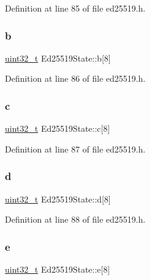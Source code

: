 Definition at line 85 of file ed25519.\+h.

\mbox{\label{structEd25519State_ab7959fd632debe6185b2c472467876d8}} 
\subsubsection{\texorpdfstring{b}{b}}
{\footnotesize\ttfamily \hyperlink{stdint_8h_a435d1572bf3f880d55459d9805097f62}{uint32\+\_\+t} Ed25519\+State\+::b\mbox{[}8\mbox{]}}



Definition at line 86 of file ed25519.\+h.

\mbox{\label{structEd25519State_a89709eaf7e108ce3561694b0f5a2d107}} 
\subsubsection{\texorpdfstring{c}{c}}
{\footnotesize\ttfamily \hyperlink{stdint_8h_a435d1572bf3f880d55459d9805097f62}{uint32\+\_\+t} Ed25519\+State\+::c\mbox{[}8\mbox{]}}



Definition at line 87 of file ed25519.\+h.

\mbox{\label{structEd25519State_a1a5b5dcf20f8a5ca52db680cf167e7be}} 
\subsubsection{\texorpdfstring{d}{d}}
{\footnotesize\ttfamily \hyperlink{stdint_8h_a435d1572bf3f880d55459d9805097f62}{uint32\+\_\+t} Ed25519\+State\+::d\mbox{[}8\mbox{]}}



Definition at line 88 of file ed25519.\+h.

\mbox{\label{structEd25519State_aea8e07abf5c03717fff2e06a3d403b05}} 
\subsubsection{\texorpdfstring{e}{e}}
{\footnotesize\ttfamily \hyperlink{stdint_8h_a435d1572bf3f880d55459d9805097f62}{uint32\+\_\+t} Ed25519\+State\+::e\mbox{[}8\mbox{]}}



